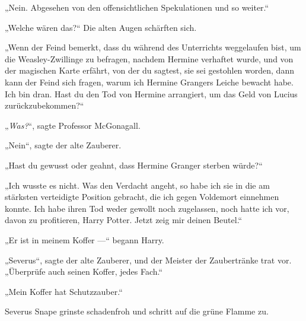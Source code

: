„Nein. Abgesehen von den offensichtlichen Spekulationen und so weiter.“

„Welche wären das?“ Die alten Augen schärften sich.

„Wenn der Feind bemerkt, dass du während des Unterrichts weggelaufen bist, um die Weasley-Zwillinge zu befragen, nachdem Hermine verhaftet wurde, und von der magischen Karte erfährt, von der du sagtest, sie sei gestohlen worden, dann kann der Feind sich fragen, warum ich Hermine Grangers Leiche bewacht habe. Ich bin dran. Hast du den Tod von Hermine arrangiert, um das Geld von Lucius zurückzubekommen?“

„\emph{Was?}“, sagte Professor McGonagall.

„Nein“, sagte der alte Zauberer.

„Hast du gewusst oder geahnt, dass Hermine Granger sterben würde?“

„Ich wusste es nicht. Was den Verdacht angeht, so habe ich sie in die am stärksten verteidigte Position gebracht, die ich gegen Voldemort einnehmen konnte. Ich habe ihren Tod weder gewollt noch zugelassen, noch hatte ich vor, davon zu profitieren, Harry Potter. Jetzt zeig mir deinen Beutel.“

„Er ist in meinem Koffer —“ begann Harry.

„Severus“, sagte der alte Zauberer, und der Meister der Zaubertränke trat vor. „Überprüfe auch seinen Koffer, jedes Fach.“

„Mein Koffer hat Schutzzauber.“

Severus Snape grinste schadenfroh und schritt auf die grüne Flamme zu.

